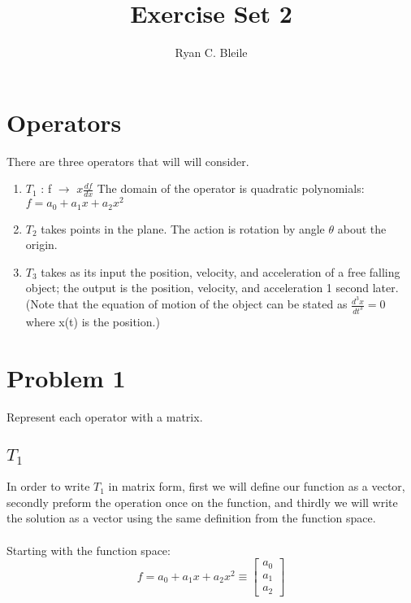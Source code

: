 \documentclass[12pt]{article}
\title{Exercise Set 2}
\author{Ryan C. Bleile}
\begin{document}
\maketitle

\section*{Operators}

There are three operators that will will consider.

\begin{enumerate}
\item	$T_{1}$ : f $\rightarrow$ $x \frac{df}{dx}$ The domain of the operator is quadratic polynomials:\\
		$f = a_{0} + a_{1}x + a_{2}x^{2}$
\item	$T_{2}$ takes points in the plane. The action is rotation by angle $\theta$ about the origin.
\item	$T_{3}$ takes as its input the position, velocity, and acceleration of a free falling object; the output is the position, velocity, and acceleration 1 second later. (Note that the equation of motion of the object can be stated as $\frac{d^{3}x}{dt^{3}} = 0$ where x(t) is the position.) 
\end{enumerate}

\section{Problem 1}

Represent each operator with a matrix.\\

\subsection{$T_{1}$}

In order to write $T_{1}$ in matrix form, first we will define our function as a vector, secondly preform the operation once on the function, and thirdly we will write the solution as a vector using the same definition from the function space.\\
\\
Starting with the function space:
\[
f = a_{0} + a_{1}x + a_{2}x^{2} \equiv
\begin{bmatrix}
a_{0}\\
a_{1}\\
a_{2}
\end{bmatrix}
\]
\end{document}
